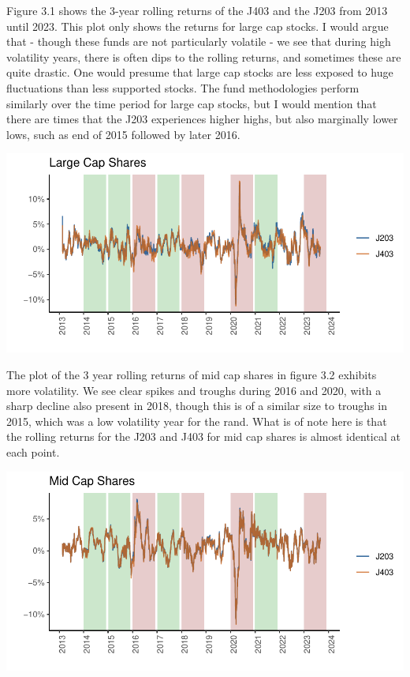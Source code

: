 \documentclass[11pt,preprint, authoryear]{elsarticle}
\let\origfigure\figure
\let\endorigfigure\endfigure
\renewenvironment{figure}[1][2] {
    \expandafter\origfigure\expandafter[H]
} {
    \endorigfigure
}
\numberwithin{equation}{section}
\numberwithin{figure}{section}
\numberwithin{table}{section}
\begin{document}
Figure 3.1 shows the 3-year rolling returns of the J403 and the J203
from 2013 until 2023. This plot only shows the returns for large cap
stocks. I would argue that - though these funds are not particularly
volatile - we see that during high volatility years, there is often dips
to the rolling returns, and sometimes these are quite drastic. One would
presume that large cap stocks are less exposed to huge fluctuations than
less supported stocks. The fund methodologies perform similarly over the
time period for large cap stocks, but I would mention that there are
times that the J203 experiences higher highs, but also marginally lower
lows, such as end of 2015 followed by later 2016.

\begin{figure}[H]

{\centering \includegraphics{Question-3_files/figure-latex/unnamed-chunk-1-1} 

}

\caption{Large Cap Stocks \label{Figure3.1}}\label{fig:unnamed-chunk-1}
\end{figure}

The plot of the 3 year rolling returns of mid cap shares in figure 3.2
exhibits more volatility. We see clear spikes and troughs during 2016
and 2020, with a sharp decline also present in 2018, though this is of a
similar size to troughs in 2015, which was a low volatility year for the
rand. What is of note here is that the rolling returns for the J203 and
J403 for mid cap shares is almost identical at each point.

\begin{figure}[H]

{\centering \includegraphics{Question-3_files/figure-latex/unnamed-chunk-2-1} 

}

\caption{Mid Cap Stocks \label{Figure3.2}}\label{fig:unnamed-chunk-2}
\end{figure}
\end{document}
